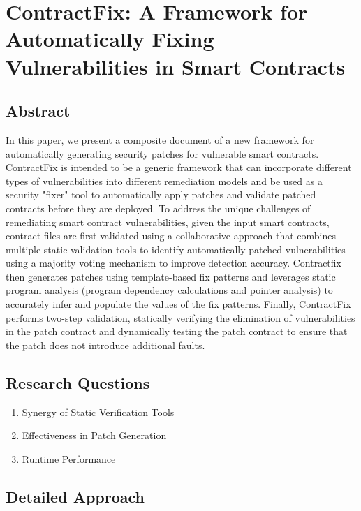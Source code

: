 \documentclass[a4paper, 10pt, conference, twocolumn]{ieeeconf}       %
\begin{document}
\section{ContractFix: A Framework for Automatically Fixing Vulnerabilities in Smart Contracts}

\subsection{Abstract}

In this paper, we present a composite document of a new framework for automatically generating security patches for vulnerable smart contracts.
ContractFix is intended to be a generic framework that can incorporate different types of vulnerabilities into different remediation models and be used as a security "fixer" tool to automatically apply patches and validate patched contracts before they are deployed.
To address the unique challenges of remediating smart contract vulnerabilities, given the input smart contracts, contract files are first validated using a collaborative approach that combines multiple static validation tools to identify automatically patched vulnerabilities using a majority voting mechanism to improve detection accuracy.
Contractfix then generates patches using template-based fix patterns and leverages static program analysis (program dependency calculations and pointer analysis) to accurately infer and populate the values of the fix patterns.
Finally, ContractFix performs two-step validation, statically verifying the elimination of vulnerabilities in the patch contract and dynamically testing the patch contract to ensure that the patch does not introduce additional faults.

\subsection{Research Questions}

\begin{enumerate}
    \item Synergy of Static Verification Tools
    \item Effectiveness in Patch Generation
    \item Runtime Performance
\end{enumerate}

\subsection{Detailed Approach}
\end{document}
